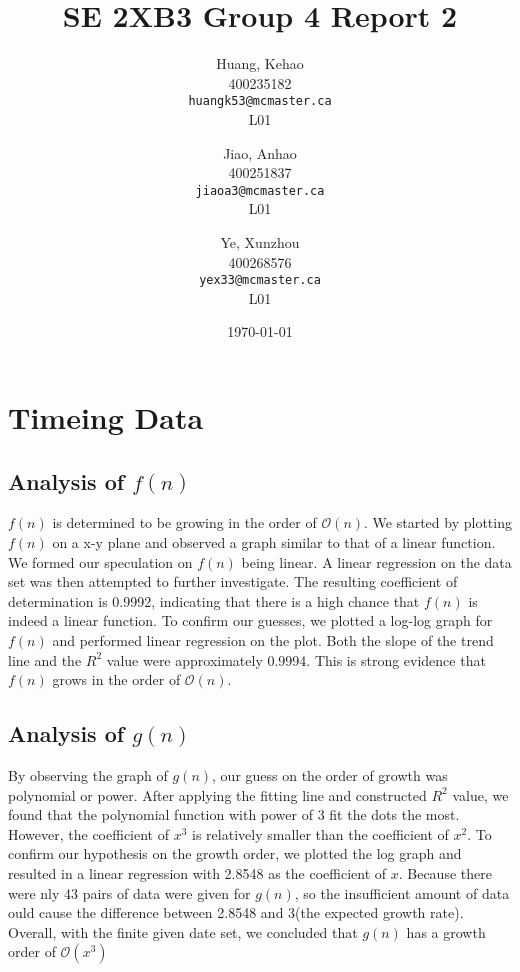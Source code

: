 \documentclass[titlepage, 12pt]{article}
\title{SE 2XB3 Group 4 Report 2}
\author{
  Huang, Kehao \\
  400235182 \\
  \texttt{huangk53@mcmaster.ca} \\
  L01
  \and
  Jiao, Anhao \\
  400251837 \\
  \texttt{jiaoa3@mcmaster.ca} \\
  L01
  \and
  Ye, Xunzhou \\
  400268576 \\
  \texttt{yex33@mcmaster.ca} \\
  L01
}
\date{\today}
\begin{document}
\maketitle{}

\newpage{}

\section{Timeing Data}

\subsection{Analysis of $f(n)$}
$f(n)$ is determined to be growing in the order of $\mathcal{O}(n)$. We started by 
plotting $f(n)$ on a x-y plane and observed a graph similar to that of 
a linear function. We formed our speculation on $f(n)$ being linear. A 
linear regression on the data set was then attempted to further 
investigate. The resulting coefficient of determination is 0.9992, 
indicating that there is a high chance that $f(n)$ is indeed a linear 
function. To confirm our guesses, we plotted a log-log graph for $f(n)$ 
and performed linear regression on the plot. Both the slope of the trend 
line and the $R^{2}$ value were approximately 0.9994. This 
is strong evidence that $f(n)$ grows in the order of $\mathcal{O}(n)$.

\subsection{Analysis of $g(n)$}
By observing the graph of $g(n)$, our guess on the order of growth was polynomial 
or power. After applying the fitting line and constructed $R^{2}$ value, we found 
that the polynomial function with power of 3 fit the dots the most. However, 
the coefficient of $x^{3}$ is relatively smaller than the coefficient of $x^{2}$. To 
confirm our hypothesis on the growth order, we plotted the log graph and resulted 
in a linear regression with 2.8548 as the coefficient of $x$. Because there were 
nly 43 pairs of data were given for $g(n)$, so the insufficient amount of data 
ould cause the difference between 2.8548 and 3(the expected growth rate). 
Overall, with the finite given date set, we concluded that $g(n)$ has a growth 
order of $\mathcal{O}(x^{3})$
\end{document}
